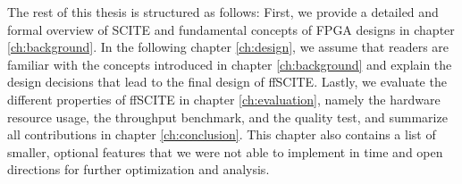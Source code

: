The rest of this thesis is structured as follows: First, we provide a detailed and formal overview of \ac{SCITE} and fundamental concepts of \ac{FPGA} designs in chapter \ref{ch:background}. In the following chapter \ref{ch:design}, we assume that readers are familiar with the concepts introduced in chapter \ref{ch:background} and explain the design decisions that lead to the final design of \ac{ffSCITE}. Lastly, we evaluate the different properties of \ac{ffSCITE} in chapter \ref{ch:evaluation}, namely the hardware resource usage, the throughput benchmark, and the quality test, and summarize all contributions in chapter \ref{ch:conclusion}. This chapter also contains a list of smaller, optional features that we were not able to implement in time and open directions for further optimization and analysis.